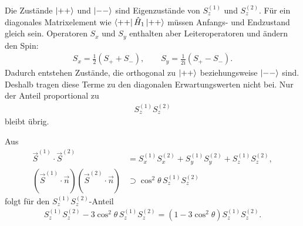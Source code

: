\documentclass[11pt,a4paper]{scrartcl}
\newcommand{\ii}{\mathrm{i}}
\newcommand{\op}[1]{\hat{#1}}
\begin{document}
\begin{enumerate}[label=(\alph*)]
\begin{calculationbox}
            \begin{calculationbox}[title=Warum nur $S_z^{(1)}S_z^{(2)}$?]
                Die Zustände $\ket{++}$ und $\ket{--}$ sind Eigenzustände von $S_z^{(1)}$ und $S_z^{(2)}$. Für ein diagonales Matrixelement wie $\bra{++}\op H_1\ket{++}$ müssen Anfangs- und Endzustand gleich sein. Operatoren $S_x$ und $S_y$ enthalten aber Leiteroperatoren und ändern den Spin:
                \begin{align*}
                    S_x=\frac12(S_++S_-),
                    \qquad
                    S_y=\frac{1}{2\ii}(S_+-S_-).
                \end{align*}
                Dadurch entstehen Zustände, die orthogonal zu $\ket{++}$ beziehungsweise $\ket{--}$ sind. Deshalb tragen diese Terme zu den diagonalen Erwartungswerten nicht bei. Nur der Anteil proportional zu
                \begin{align*}
                    S_z^{(1)}S_z^{(2)}
                \end{align*}
                bleibt übrig.
            \end{calculationbox}

            \begin{calculationbox}[title=Koeffizient vor $S_z^{(1)}S_z^{(2)}$]
                Aus
                \begin{align*}
                    \vec S^{(1)}\cdot\vec S^{(2)}
                    &=
                    S_x^{(1)}S_x^{(2)}+S_y^{(1)}S_y^{(2)}+S_z^{(1)}S_z^{(2)},\\
                    (\vec S^{(1)}\cdot\vec n)(\vec S^{(2)}\cdot\vec n)
                    &\supset
                    \cos^2\theta\,S_z^{(1)}S_z^{(2)}
                \end{align*}
                folgt für den $S_z^{(1)}S_z^{(2)}$-Anteil
                \begin{align*}
                    S_z^{(1)}S_z^{(2)}
                    -3\cos^2\theta\,S_z^{(1)}S_z^{(2)}
                    =
                    (1-3\cos^2\theta)S_z^{(1)}S_z^{(2)}.
                \end{align*}
            \end{calculationbox}


\end{calculationbox}
\end{enumerate}
\end{document}
